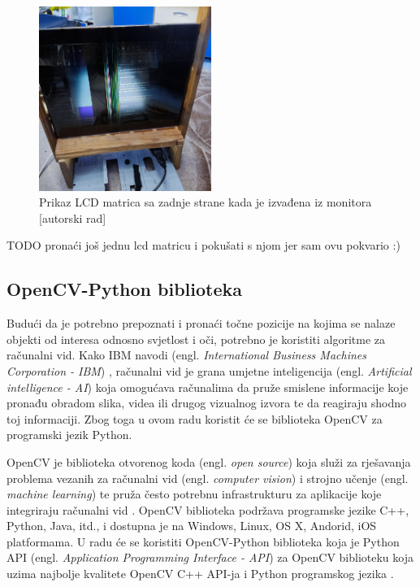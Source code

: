 \documentclass{foi}
\begin{document}
\begin{figure}[h!]
    \centering
    \includegraphics[width=0.5\textwidth]{slike/lcd_matrica_2}
    \caption{Prikaz LCD matrica sa zadnje strane kada je izvađena iz monitora [autorski rad]}
    \label{fig:lcd_matrica_2}
\end{figure}

TODO pronaći još jednu lcd matricu i pokušati s njom jer sam ovu pokvario :)

\subsection{OpenCV-Python biblioteka}

Budući da je potrebno prepoznati i pronaći točne pozicije na kojima se nalaze objekti od interesa odnosno svjetlost i oči, potrebno je koristiti algoritme za računalni vid. Kako IBM navodi (engl. \emph{International Business Machines Corporation - IBM}) \cite{cv-ibm}, računalni vid je grana umjetne inteligencija (engl. \emph{Artificial intelligence - AI}) koja omogućava računalima da pruže smislene informacije koje pronađu obradom slika, videa ili drugog vizualnog izvora te da reagiraju shodno toj informaciji. Zbog toga u ovom radu koristit će se biblioteka OpenCV za programski jezik Python.

OpenCV je biblioteka otvorenog koda (engl. \emph{open source}) koja služi za rješavanja problema vezanih za računalni vid (engl. \emph{computer vision}) i strojno učenje (engl. \emph{machine learning}) te pruža često potrebnu infrastrukturu za aplikacije koje integriraju računalni vid \cite{opencv}. OpenCV biblioteka podržava programske jezike C++, Python, Java, itd., i dostupna je na Windows, Linux, OS X, Andorid, iOS platformama. U radu će se koristiti OpenCV-Python biblioteka koja je Python API (engl. \emph{Application Programming Interface - API}) za OpenCV biblioteku koja uzima najbolje kvalitete OpenCV C++ API-ja i Python programskog jezika \cite{opencv-python}.
\end{document}
